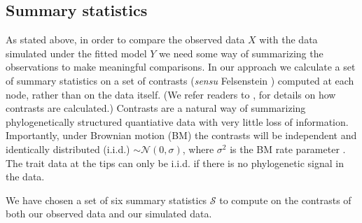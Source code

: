 \documentclass[a4paper,12pt]{article}
\begin{document}
\subsection{Summary statistics}
As stated above, in order to compare the observed data $X$ with the data simulated under the fitted model $Y$ we need some way of summarizing the observations to make meaningful comparisons. 
In our approach we calculate a set of summary statistics on a set of contrasts (\textit{sensu} Felsenstein \citep{Felsenstein1985}) computed at each node, rather than on the data itself. (We refer readers to \citep{Felsenstein1985, Rohlf2001, Blomberg2012}, for details on how contrasts are calculated.) Contrasts are a natural way of summarizing phylogenetically structured quantiative data with very little loss of information. Importantly, under Brownian motion (BM) the contrasts will be independent and identically distributed (i.i.d.) $\sim \mathcal{N}(0, \sigma)$, where $\sigma^2$ is the BM rate parameter \citep{Felsenstein1985}. The trait data at the tips can only be i.i.d. if there is no phylogenetic signal in the data. 

We have chosen a set of six summary statistics $\mathcal{S}$ to compute on the contrasts of both our observed data and our simulated data.
\end{document}
